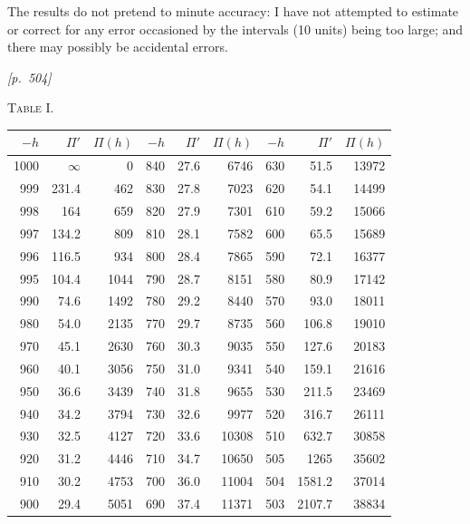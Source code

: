 \documentclass[11pt]{article}
\begin{document}
The results do not pretend to minute accuracy: I have not attempted to
estimate or correct for any error occasioned by the intervals (10 units)
being too large; and there may possibly be accidental errors.

\newpage

\noindent\textit{[p.~504]}

\medskip

\begin{center}\textsc{Table I.}\end{center}

\medskip

\begin{center}
\begin{tabular}{|r|r|r||r|r|r||r|r|r|}
\hline
$-h$ & $\Pi'$ & $\Pi(h)$ & $-h$ & $\Pi'$ & $\Pi(h)$ & $-h$ & $\Pi'$ & $\Pi(h)$ \\ \hline
1000 & $\infty$ & 0       & 840 & 27.6  & 6746  & 630 & 51.5  & 13972 \\
999  & 231.4    & 462     & 830 & 27.8  & 7023  & 620 & 54.1  & 14499 \\
998  & 164      & 659     & 820 & 27.9  & 7301  & 610 & 59.2  & 15066 \\
997  & 134.2    & 809     & 810 & 28.1  & 7582  & 600 & 65.5  & 15689 \\
996  & 116.5    & 934     & 800 & 28.4  & 7865  & 590 & 72.1  & 16377 \\
995  & 104.4    & 1044    & 790 & 28.7  & 8151  & 580 & 80.9  & 17142 \\
990  & 74.6     & 1492    & 780 & 29.2  & 8440  & 570 & 93.0  & 18011 \\
980  & 54.0     & 2135    & 770 & 29.7  & 8735  & 560 & 106.8 & 19010 \\
970  & 45.1     & 2630    & 760 & 30.3  & 9035  & 550 & 127.6 & 20183 \\
960  & 40.1     & 3056    & 750 & 31.0  & 9341  & 540 & 159.1 & 21616 \\
950  & 36.6     & 3439    & 740 & 31.8  & 9655  & 530 & 211.5 & 23469 \\
940  & 34.2     & 3794    & 730 & 32.6  & 9977  & 520 & 316.7 & 26111 \\
930  & 32.5     & 4127    & 720 & 33.6  & 10308 & 510 & 632.7 & 30858 \\
920  & 31.2     & 4446    & 710 & 34.7  & 10650 & 505 & 1265  & 35602 \\
910  & 30.2     & 4753    & 700 & 36.0  & 11004 & 504 & 1581.2 & 37014 \\
900  & 29.4     & 5051    & 690 & 37.4  & 11371 & 503 & 2107.7 & 38834 \\

\end{tabular}
\end{center}
\end{document}
